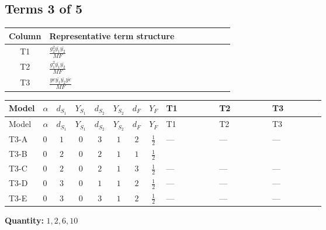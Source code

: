 \documentclass[8pt]{article}
\begin{document}
\begin{landscape}
\subsection*{Terms 3 of 5}
\begin{center}
\begin{tabular}{@{}c >{\raggedright\arraybackslash}p{0.82\linewidth}@{}}
\toprule
Column & Representative term structure \\
\midrule
T1 & \(\displaystyle \frac{g_{2}^{2} \overline{y_{1}} \overline{y_{2}}}{MF}\) \\
\midrule
T2 & \(\displaystyle \frac{g_{1}^{2} \overline{y_{1}} \overline{y_{2}}}{MF}\) \\
\midrule
T3 & \(\displaystyle \frac{ye \overline{y_{1}} \overline{y_{2}} \overline{ye}}{MF}\) \\
\midrule
\bottomrule
\end{tabular}
\end{center}
\smallskip
\tiny
\begin{longtable}{@{}llcccccc >{\raggedright\arraybackslash}p{0.21\linewidth} >{\raggedright\arraybackslash}p{0.21\linewidth} >{\raggedright\arraybackslash}p{0.21\linewidth}@{}}
\toprule
Model & $\alpha$ & $d_{S_1}$ & $Y_{S_1}$ & $d_{S_2}$ & $Y_{S_2}$ & $d_F$ & $Y_F$ & T1 & T2 & T3 \\
\midrule
\endfirsthead
\toprule
Model & $\alpha$ & $d_{S_1}$ & $Y_{S_1}$ & $d_{S_2}$ & $Y_{S_2}$ & $d_F$ & $Y_F$ & T1 & T2 & T3 \\
\midrule
\endhead
T3-A & $0$ & $1$ & $0$ & $3$ & $1$ & $2$ & $\frac{1}{2}$ & --- & --- & --- \\
\midrule
T3-B & $0$ & $2$ & $0$ & $2$ & $1$ & $1$ & $\frac{1}{2}$ & \scriptsize\adjustbox{max width=\linewidth}{$\begin{gathered} \frac{3 g_{2}^{2} \overline{y_{1}} \overline{y_{2}}}{8 MF}\end{gathered}$} & \scriptsize\adjustbox{max width=\linewidth}{$\begin{gathered} \frac{3 g_{1}^{2} \overline{y_{1}} \overline{y_{2}}}{16 MF}\end{gathered}$} & \scriptsize\adjustbox{max width=\linewidth}{$\begin{gathered} - \frac{ye \overline{y_{1}} \overline{y_{2}} \overline{ye}}{8 MF}\end{gathered}$} \\
\midrule
T3-C & $0$ & $2$ & $0$ & $2$ & $1$ & $3$ & $\frac{1}{2}$ & --- & --- & --- \\
\midrule
T3-D & $0$ & $3$ & $0$ & $1$ & $1$ & $2$ & $\frac{1}{2}$ & --- & --- & --- \\
\midrule
T3-E & $0$ & $3$ & $0$ & $3$ & $1$ & $2$ & $\frac{1}{2}$ & --- & --- & --- \\
\midrule
\bottomrule
\end{longtable}
\clearpage
\noindent\textbf{Quantity: }$\mathrm{1,2,6,10}$\par\smallskip

\end{landscape}
\end{document}
